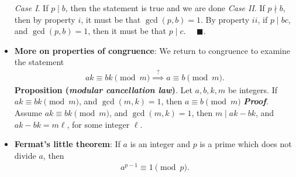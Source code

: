 \documentclass{report}
\begin{document}
\begin{itemize}
        \bigbreak \noindent 
        \textit{Case I}. If $p\mid b$, then the statement is true and we are done
        \bigbreak \noindent 
        \textit{Case II}. If $p\nmid b$, then by property $i$, it must be that $\gcd{(p,b)} = 1$. By property $ii$, if $p \mid bc$, and $\gcd{(p,b)} = 1$, then it must be that $p \mid c$. $\quad \blacksquare$.
    \item \textbf{More on properties of congruence}: We return to congruence to examine the statement
        \begin{align*}
            ak \equiv bk \pmod{m} \stackrel{?}{\implies} a\equiv b \pmod{m}
        .\end{align*}
        \bigbreak \noindent 
        \textbf{Proposition (\textit{modular cancellation law})}. Let $a,b,k,m$ be integers. If $ak \equiv bk \pmod{m}$, and $\gcd{(m,k)} = 1$, then $a \equiv b \pmod{m}$
        \bigbreak \noindent 
        \textbf{\textit{Proof}}. Assume $ak \equiv bk\pmod{m}$, and $\gcd{(m,k)} =1$, then $m \mid ak-bk$, and $ak-bk = m\ell$, for some integer $\ell$. 
        \bigbreak \noindent 
    \item \textbf{Fermat's little theorem}: If $a$ is an integer and $p$ is a prime which does not divide $a$, then
        \begin{align*}
            a^{p-1} \equiv 1 \pmod{p}
        .\end{align*}
        \bigbreak \noindent 

\end{itemize}
\end{document}
